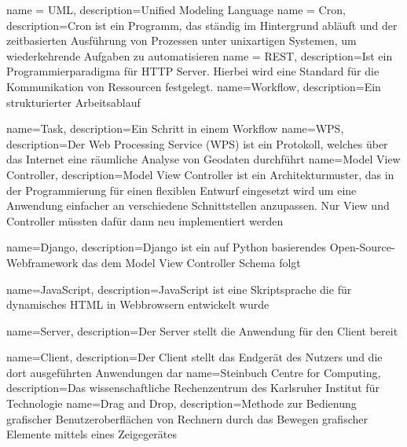 %
%

{ 
    name = UML, 
    description={Unified Modeling Language}
}
{
    name = Cron,
    description={Cron ist ein Programm, das ständig im Hintergrund abläuft und der zeitbasierten Ausführung von Prozessen unter unixartigen Systemen, um wiederkehrende Aufgaben zu automatisieren}
}
{
    name = REST,
    description={Ist ein Programmierparadigma für HTTP Server. Hierbei wird eine Standard für die Kommunikation von Ressourcen festgelegt.}
}
{
    name=Workflow,
    description={Ein strukturierter Arbeitsablauf}
}

{
    name=Task,
    description={Ein Schritt in einem Workflow}
}
{
    name=WPS,
    description={Der Web Processing Service (WPS) ist ein Protokoll, welches über das Internet eine räumliche Analyse von Geodaten durchführt}
}
{
    name=Model View Controller,
    description={Model View Controller ist ein Architekturmuster, das in der Programmierung für einen flexiblen Entwurf eingesetzt wird um eine Anwendung einfacher an verschiedene Schnittstellen anzupassen. Nur View und Controller müssten dafür dann neu implementiert werden}
}

{
    name=Django,
    description={Django ist ein auf Python basierendes Open-Source-Webframework das dem \Gls{Model View Controller} Schema folgt}
}

{
    name=JavaScript,
    description={JavaScript ist eine Skriptsprache die für dynamisches HTML in Webbrowsern entwickelt wurde}
}

{
    name=Server,
    description={Der Server stellt die Anwendung für den Client bereit}
}

{
    name=Client,
    description={Der Client stellt das Endgerät des Nutzers und die dort ausgeführten Anwendungen dar}
}
{
    name=Steinbuch Centre for Computing,
    description={Das wissenschaftliche Rechenzentrum des Karlsruher Institut für Technologie}
}
{
    name=Drag and Drop,
    description={Methode zur Bedienung grafischer Benutzeroberflächen von Rechnern durch das Bewegen grafischer Elemente mittels eines Zeigegerätes}
}
